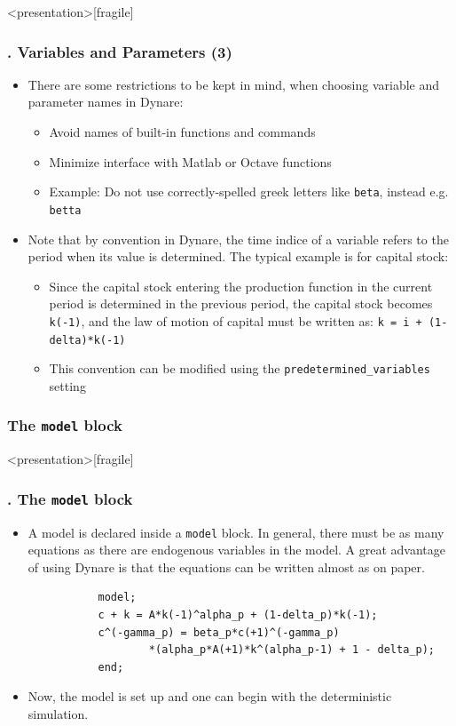 \documentclass[11pt,aspectratio=169]{beamer}
\begin{document}
\begin{frame}<presentation>[fragile]
	\frametitle{{\thesection.\thesubsection\thinspace\thesubsubsection} Variables and Parameters (3)}
	\begin{itemize}
		\item There are some restrictions to be kept in mind, when choosing variable and parameter names in Dynare:
			\begin{itemize} 
				\item Avoid names of built-in functions and commands
				\item Minimize interface with Matlab or Octave functions
				\item Example: Do not use correctly-spelled greek letters like \texttt{beta}, instead e.g. \texttt{betta}
			\end{itemize}
		\item Note that by convention in Dynare, the time indice of a variable refers to the period when its value is determined. The typical example is for capital stock:
			\begin{itemize}
				\item Since the capital stock entering the production function in the current period is determined in the previous period, the capital stock becomes \texttt{k(-1)}, and the law of motion of capital must be written as: \texttt{k = i + (1-delta)*k(-1)} 
				\item This convention can be modified using the \texttt{predetermined\_variables} setting
			\end{itemize}
	\end{itemize}
\end{frame}
\subsubsection{The \texttt{model} block}
\begin{frame}<presentation>[fragile]
	\frametitle{{\thesection.\thesubsection\thinspace\thesubsubsection} The \texttt{model} block}
	\begin{itemize}
		\item A model is declared inside a \texttt{model} block. In general, there must be as many equations as there are endogenous variables in the model. A great advantage of using Dynare is that the equations can be written almost as on paper.
		\begin{verbatim}
		   model;
		   c + k = A*k(-1)^alpha_p + (1-delta_p)*k(-1);
		   c^(-gamma_p) = beta_p*c(+1)^(-gamma_p)
		           *(alpha_p*A(+1)*k^(alpha_p-1) + 1 - delta_p);
		   end;
		\end{verbatim}
		\item Now, the model is set up and one can begin with the deterministic simulation. 
	\end{itemize}
\end{frame}
\end{document}
